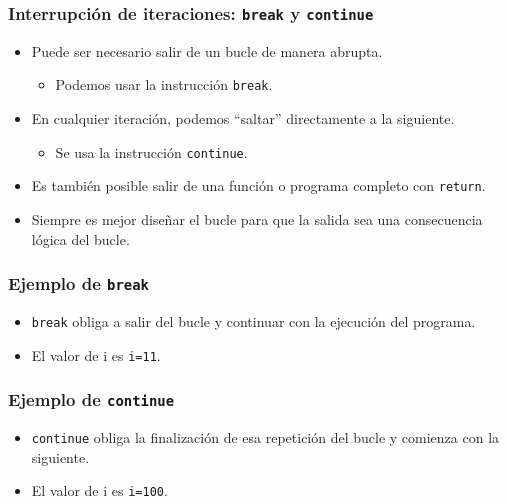 \begin{frame}[label=break_continue]
 \frametitle{Interrupción de iteraciones: \texttt{break} y \texttt{continue}}
 \begin{itemize}
  \item Puede ser necesario \alert{salir} de un bucle de manera abrupta.
  \begin{itemize}
   \item Podemos usar la instrucción \alert{\texttt{break}}.
  \end{itemize}
  \item En cualquier iteración, podemos \alert{“saltar”} directamente a la siguiente.
  \begin{itemize}
   \item Se usa la instrucción \alert{\texttt{continue}}.
  \end{itemize}
  \item Es también posible salir de una función o programa completo con
    \alert{\texttt{return}}.
  \item Siempre es mejor diseñar el bucle para que la salida sea una
     consecuencia lógica del bucle.
 \end{itemize}
\end{frame}
\begin{frame}[label=break,fragile]
 \frametitle{Ejemplo de \texttt{break}}
 \begin{itemize}
  \item \alert{\texttt{break}} obliga a salir del bucle y continuar con la
    ejecución del programa.
 \begin{small}
  \lstI
 \end{small}
  \item El valor de i es \alert{\texttt{i=11}}.
 \end{itemize}
\end{frame}
\begin{frame}[label=continue,fragile]
 \frametitle{Ejemplo de \texttt{continue}}
 \begin{itemize}
  \item \alert{\texttt{continue}} obliga la finalización de esa repetición
del bucle y comienza con la siguiente.
 \begin{scriptsize}
  \lstI
 \end{scriptsize}
  \item El valor de i es \alert{\texttt{i=100}}.
 \end{itemize}
\end{frame}

